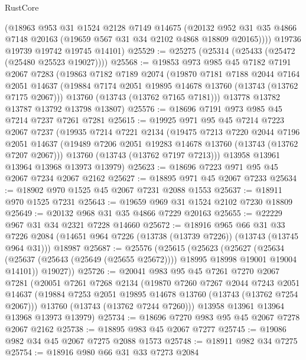 \begin{lexlean}{RustCore}
\begin{coremodule}
        (@18963
          @953
          @31
          @1524
          @2128
          @7149
          @14675
          (@20132 @952 @31 @35 @4866 @7148 @20163 (@19659 @567 @31 @34 @2102 @4868 @18809 @20165))))
      @19736
      @19739
      @19742
      @19745
      @14101)
@25529 := @25275 (@25314 (@25433 (@25472 (@25480 @25523 @19027))))
@25568 := @19853
    @973
    @985
    @45
    @7182
    @7191
    @2067
    @7283
    (@19863
      @7182
      @7189
      @2074
      (@19870
        @7181
        @7188
        @2044
        @7164
        @2051
        @14637
        (@19884 @7174 @2051 @19895 @14678 @13760 (@13743 (@13762 @7175 @2067)))
        @13760
        (@13743 (@13762 @7165 @7181)))
      @13778
      @13782
      @13787
      @13792
      @13798
      @13807)
@25576 := @18696 @7191 @973 @985 @45 @7214 @7237 @7261 @7281
@25615 := @19925
    @971
    @95
    @45
    @7214
    @7223
    @2067
    @7237
    (@19935
      @7214
      @7221
      @2134
      (@19475
        @7213
        @7220
        @2044
        @7196
        @2051
        @14637
        (@19489 @7206 @2051 @19283 @14678 @13760 (@13743 (@13762 @7207 @2067)))
        @13760
        (@13743 (@13762 @7197 @7213)))
      @13958
      @13961
      @13964
      @13968
      @13973
      @13979)
@25623 := @18696 @7223 @971 @95 @45 @2067 @7234 @2067 @2162
@25627 := @18895 @971 @45 @2067 @7233
@25634 := @18902 @970 @1525 @45 @2067 @7231 @2088 @1553
@25637 := @18911 @970 @1525 @7231
@25643 := @19659 @969 @31 @1524 @2102 @7230 @18809
@25649 := @20132 @968 @31 @35 @4866 @7229 @20163
@25655 := @22229 @967 @31 @34 @2321 @7228 @14660
@25672 := @18916
    @965
    @66
    @31
    @33
    @7226
    @2084
    (@14651 @964 @7226 (@13738 (@13739 @7226)) (@13743 (@13745 @964 @31)))
    @18987
@25687 := @25576
    (@25615
      (@25623
        (@25627
          (@25634 (@25637 (@25643 (@25649 (@25655 @25672)))) @18995 @18998 @19001 @19004 @14101))
        @19027))
@25726 := @20041
    @983
    @95
    @45
    @7261
    @7270
    @2067
    @7281
    (@20051
      @7261
      @7268
      @2134
      (@19870
        @7260
        @7267
        @2044
        @7243
        @2051
        @14637
        (@19884 @7253 @2051 @19895 @14678 @13760 (@13743 (@13762 @7254 @2067)))
        @13760
        (@13743 (@13762 @7244 @7260)))
      @13958
      @13961
      @13964
      @13968
      @13973
      @13979)
@25734 := @18696 @7270 @983 @95 @45 @2067 @7278 @2067 @2162
@25738 := @18895 @983 @45 @2067 @7277
@25745 := @19086 @982 @34 @45 @2067 @7275 @2088 @1573
@25748 := @18911 @982 @34 @7275
@25754 := @18916 @980 @66 @31 @33 @7273 @2084

\end{coremodule}
\end{lexlean}
